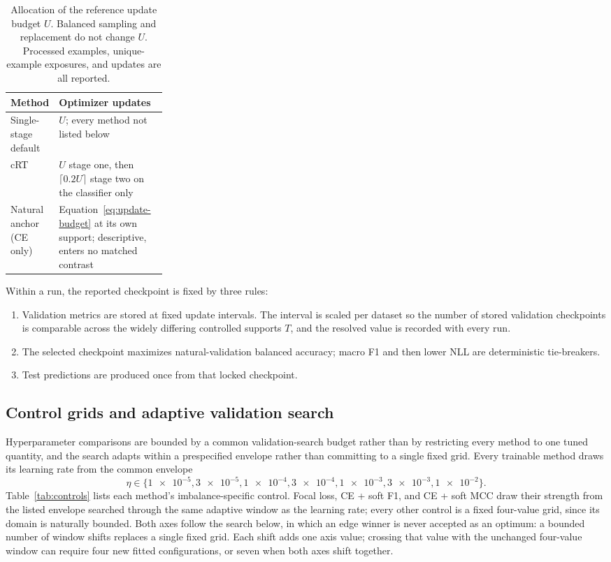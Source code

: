 \documentclass[11pt]{article}
\begin{document}
\begin{table}[ht]
  \centering
  \footnotesize
  \begin{tabularx}{\linewidth}{@{}>{\raggedright\arraybackslash}p{0.26\linewidth}X@{}}
    \toprule
    Method & Optimizer updates \\
    \midrule
    Single-stage default & $U$; every method not listed below \\
    cRT & $U$ stage one, then $\lceil0.2U\rceil$ stage two on the classifier only \\
    Natural anchor (CE only) & Equation~\eqref{eq:update-budget} at its own support; descriptive, enters no matched contrast \\
    \bottomrule
  \end{tabularx}
  \caption{Allocation of the reference update budget $U$. Balanced sampling and replacement do not change $U$. Processed examples, unique-example exposures, and updates are all reported.}
  \label{tab:budgets}
\end{table}

\noindent Within a run, the reported checkpoint is fixed by three rules:
\begin{enumerate}
  \item Validation metrics are stored at fixed update intervals. The interval is scaled per dataset so the number of stored validation checkpoints is comparable across the widely differing controlled supports $T$, and the resolved value is recorded with every run.
  \item The selected checkpoint maximizes natural-validation balanced accuracy; macro F1 and then lower NLL are deterministic tie-breakers.
  \item Test predictions are produced once from that locked checkpoint.
\end{enumerate}

\subsection{Control grids and adaptive validation search}
\label{app:controls}
Hyperparameter comparisons are bounded by a common validation-search budget rather than by restricting every method to one tuned quantity, and the search adapts within a prespecified envelope rather than committing to a single fixed grid. Every trainable method draws its learning rate from the common envelope
\begin{equation}
  \eta\in\{\num{1e-5},\num{3e-5},\num{1e-4},\num{3e-4},\num{1e-3},\num{3e-3},\num{1e-2}\}.
  \label{eq:learning-rate-grid}
\end{equation}
\noindent Table~\ref{tab:controls} lists each method's imbalance-specific control. Focal loss, CE + soft F1, and CE + soft MCC draw their strength from the listed envelope searched through the same adaptive window as the learning rate; every other control is a fixed four-value grid, since its domain is naturally bounded. Both axes follow the search below, in which an edge winner is never accepted as an optimum: a bounded number of window shifts replaces a single fixed grid. Each shift adds one axis value; crossing that value with the unchanged four-value window can require four new fitted configurations, or seven when both axes shift together.
\end{document}
